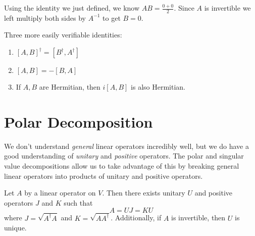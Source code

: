 \begin{lproof}
Using the identity we just defined, we know $AB = \frac{0 + 0}{2}$. Since $A$ is invertible we left multiply both sides by $A^{-1}$ to get $B = 0$. 
\end{lproof}

Three more easily verifiable identities: 
\begin{enumerate}
	\item $[A, B]^{\dagger} = [B^{\dagger}, A^{\dagger}]$
	\item $[A, B] = - [B, A]$ 
	\item If $A, B$ are Hermitian, then $i[A, B]$ is also Hermitian. 
\end{enumerate}

\section{Polar Decomposition}

We don't understand \textit{general} linear operators incredibly well, but we do have a good understanding of \textit{unitary} and \textit{positive} operators. The polar and singular value decompositions allow us to take advantage of this by breaking general linear operators into products of unitary and positive operators. 

\begin{theorem}
Let $A$ by a linear operator on $V$. Then there exists unitary $U$ and positive operators $J$ and $K$ such that 
$$A = UJ = KU$$
where $J = \sqrt{A^{\dagger}A}$ and $K = \sqrt{AA^{\dagger}}$. Additionally, if $A$ is invertible, then $U$ is unique.
\end{theorem}

